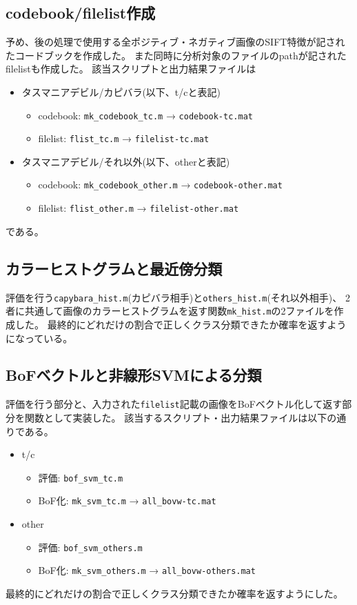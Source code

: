 \documentclass[11pt,a4paper, uplatex]{jsreport}
\begin{document}
\subsection{codebook/filelist作成}\label{sec:mkCdBookFlist}
予め、後の処理で使用する全ポジティブ・ネガティブ画像のSIFT特徴が記されたコードブックを作成した。
また同時に分析対象のファイルのpathが記されたfilelistも作成した。
該当スクリプトと出力結果ファイルは
\begin{itemize}
  \item タスマニアデビル/カピバラ(以下、t/cと表記)
  \begin{itemize}
    \item codebook: \texttt{mk_codebook_tc.m} → \texttt{codebook-tc.mat}
    \item filelist: \texttt{flist_tc.m} → \texttt{filelist-tc.mat}
  \end{itemize}
  \item タスマニアデビル/それ以外(以下、otherと表記)
  \begin{itemize}
    \item codebook: \texttt{mk_codebook_other.m} → \texttt{codebook-other.mat}
    \item filelist: \texttt{flist_other.m} → \texttt{filelist-other.mat}
  \end{itemize}
\end{itemize}
である。
\subsection{カラーヒストグラムと最近傍分類}\label{sec:defhist}
評価を行う\texttt{capybara_hist.m}(カピバラ相手)と\texttt{others_hist.m}(それ以外相手)、
2者に共通して画像のカラーヒストグラムを返す関数\texttt{mk_hist.m}の2ファイルを作成した。
最終的にどれだけの割合で正しくクラス分類できたか確率を返すようになっている。
\subsection{BoFベクトルと非線形SVMによる分類}\label{sec:defbof}
評価を行う部分と、入力された\texttt{filelist}記載の画像をBoFベクトル化して返す部分を関数として実装した。
該当するスクリプト・出力結果ファイルは以下の通りである。
\begin{itemize}
  \item t/c
  \begin{itemize}
    \item 評価: \texttt{bof_svm_tc.m}
    \item BoF化: \texttt{mk_svm_tc.m} → \texttt{all_bovw-tc.mat}
  \end{itemize}
  \item other
  \begin{itemize}
    \item 評価: \texttt{bof_svm_others.m}
    \item BoF化: \texttt{mk_svm_others.m} → \texttt{all_bovw-others.mat}
  \end{itemize}
\end{itemize}
最終的にどれだけの割合で正しくクラス分類できたか確率を返すようにした。
\end{document}
